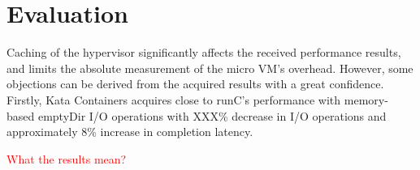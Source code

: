 \section{Evaluation}

Caching of the hypervisor significantly affects the received performance results, and limits the absolute measurement of the micro VM's overhead. However, some objections can be derived from the acquired results with a great confidence. Firstly, Kata Containers acquires close to runC's performance with memory-based emptyDir I/O operations with XXX\% decrease in I/O operations and approximately 8\% increase in completion latency.



\textcolor{red}{What the results mean?}


